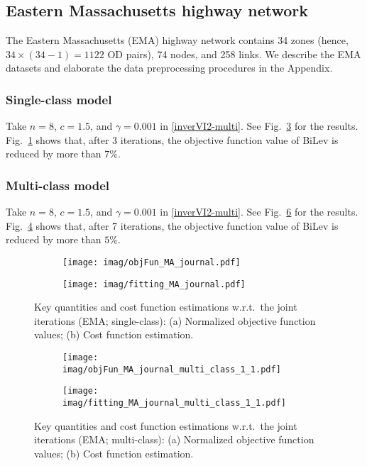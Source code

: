 \documentclass[3p]{elsarticle}
\begin{document}
\subsection{Eastern Massachusetts highway network}

The Eastern Massachusetts (EMA) highway network contains 34 zones (hence, $34 \times (34 - 1) = 1122$ OD pairs), 74 nodes, and 258 links. We describe the EMA datasets and elaborate the data preprocessing procedures in the Appendix.

\subsubsection*{Single-class model}
Take $n=8$, $c = 1.5$, and $\gamma = 0.001$ in
\eqref{inverVI2-multi}. See Fig.~\ref{fig:ema} for the
results. Fig.~\ref{objFun_ema} shows that, after 3 iterations, the
objective function value of BiLev is reduced by more than $7\%$.
	
\subsubsection*{Multi-class model}
Take $n=8$, $c = 1.5$, and $\gamma = 0.001$ in
\eqref{inverVI2-multi}. See Fig.~\ref{fig:ema-multi} for the
results. Fig.~\ref{objFun-ema-multi} shows that, after 7 iterations, the
objective function value of BiLev is reduced by more than $5\%$.

	
	\begin{figure}[H]  
	\centering
	\begin{subfigure}[b]{0.8\textwidth}
		\texttt{[image: imag/objFun\_MA\_journal.pdf]}
		\caption{}
		\label{objFun_ema}
	\end{subfigure} 
	\begin{subfigure}[b]{0.8\textwidth}
		\texttt{[image: imag/fitting\_MA\_journal.pdf]}
		\caption{}
		\label{fig:costEma}
	\end{subfigure}  
	\caption{Key quantities and cost function estimations w.r.t.\
          the joint iterations (EMA; single-class): (a) Normalized
          objective function values; (b) Cost function estimation.}
	\label{fig:ema}
\end{figure}
	
	
	\begin{figure}[H]  
	\centering
	\begin{subfigure}[b]{0.8\textwidth}
		\texttt{[image: imag/objFun\_MA\_journal\_multi\_class\_1\_1.pdf]}
		\caption{}
		\label{objFun-ema-multi}
	\end{subfigure} 
	\begin{subfigure}[b]{0.8\textwidth}
		\texttt{[image: imag/fitting\_MA\_journal\_multi\_class\_1\_1.pdf]}
		\caption{}
		\label{fig:costEma-multi}
	\end{subfigure}  
	\caption{Key quantities and cost function estimations w.r.t.\
          the joint iterations (EMA; multi-class): (a) Normalized
          objective function values; (b) Cost function estimation.}
	\label{fig:ema-multi}
\end{figure}
	
\end{document}
